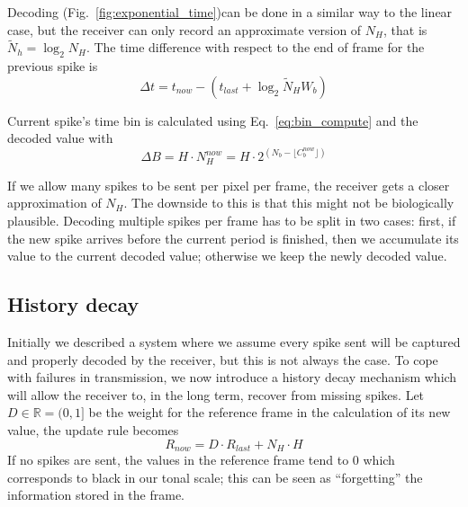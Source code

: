 \documentclass[conference]{IEEEtran}
\begin{document}
Decoding (Fig.~\ref{fig:exponential_time})can be done in a similar way to the linear case, but the receiver can only record an approximate version of $N_{H}$, that is $\tilde{N}_{h} = \log_2 N_{H}$. The time difference with respect to the end of frame for the previous spike is
\begin{equation}
\Delta t = t_{now} - \left( t_{last} + \log_{2}\tilde{N}_{H}W_{b} \right)
\label{eq:time_diff_exp}
\end{equation}

Current spike's time bin is calculated using Eq.~\ref{eq:bin_compute} and the decoded value with
\begin{equation}
\Delta B = H\cdot N_{H}^{now} = H\cdot 2^{ \left( N_{b} - \lfloor C^{now}_{b}\rfloor  \right)}
\label{eq:new_Nh_exp}
\end{equation}

If we allow many spikes to be sent per pixel per frame, the receiver gets a closer approximation of $N_{H}$. The downside to this is that this might not be biologically plausible. Decoding multiple spikes per frame has to be split in two cases: first, if the new spike arrives before the current period is finished, then we accumulate its value to the current decoded value; otherwise we keep the newly decoded value. 



\subsection{History decay} %
\label{sec:hist_decay}
Initially we described a system where we assume every spike sent will be captured and properly decoded by the receiver, but this is not always the case. To cope with failures in transmission, we now introduce a history decay mechanism which will allow the receiver to, in the long term, recover from missing spikes. Let $D \in \mathbb{R} = (0, 1]$ be the weight for the reference frame in the calculation of its new value, the update rule becomes
\begin{equation}
\label{eq:ref_update_decay}
R_{now} = D\cdot R_{last} + N_{H}\cdot H
\end{equation}
If no spikes are sent, the values in the reference frame tend to 0 which corresponds to black in our tonal scale; this can be seen as ``forgetting'' the information stored in the frame.
%
\end{document}

